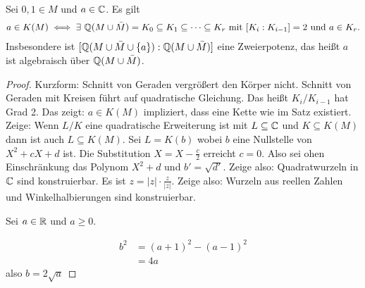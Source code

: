 \begin{Satz}
	Sei \(0,1\in M\) und \(a\in \mathbb{C}\). Es gilt
	\begin{align*} a\in K(M)\iff\exists\ \mathbb{Q}(M\cup\bar M)=K_0\subseteq K_1\subseteq\dots\subseteq K_r \text{ mit }[K_i:K_{i-1}]=2 \text{ und }a\in K_r.
	\end{align*}
	Insbesondere ist \([\mathbb{Q}(M\cup\bar M\cup\{a\}):\mathbb{Q}(M\cup\bar M)]\) eine Zweierpotenz, das heißt \(a\) ist algebraisch über \(\mathbb{Q}(M\cup\bar M)\).
\end{Satz}
\begin{proof}
	Kurzform: Schnitt von Geraden vergrößert den Körper nicht. Schnitt von Geraden mit Kreisen führt auf quadratische Gleichung. Das heißt \(K_i/K_{i-1}\) hat Grad 2. Das zeigt: \(a\in K(M)\) impliziert, dass eine Kette wie im Satz existiert.
	Zeige: Wenn \(L/K\) eine quadratische Erweiterung ist mit \(L\subseteq \mathbb{C}\) und \(K\subseteq K(M)\) dann ist auch \(L\subseteq K(M)\).
	Sei \(L=K(b)\) wobei \(b\) eine Nullstelle von \(X^2+cX+d\) ist. Die Substitution \(X=X-\frac{c}{2}\) erreicht \(c=0\). Also sei ohen Einschränkung das Polynom \(X^2+d\) und \(b'=\sqrt{d'}\). Zeige also: Quadratwurzeln in \(\mathbb{C}\) sind konstruierbar. Es ist \(z=|z|\cdot\frac{z}{|z|}\). Zeige also: Wurzeln aus reellen Zahlen und Winkelhalbierungen sind konstruierbar.
	\begin{center}\end{center}
	Sei \(a\in\mathbb{R}\) und \(a\geq 0\).
	\begin{center}\end{center}
	\begin{align*}
		b^2&=(a+1)^2-(a-1)^2\\
		&=4a
	\end{align*} also \(b=2\sqrt{a}\)
\end{proof}
